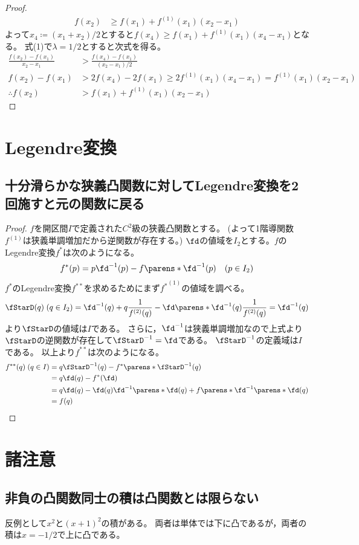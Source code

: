 \begin{proof}
\begin{align*}
                    f(x_2) &\geq f(x_1) + f^{(1)}(x_1)(x_2-x_1)
                \end{align*}
                よって$x_4 \coloneq (x_1 + x_2)/2$とすると$f(x_4) \geq f(x_1) + f^{(1)}(x_1)(x_4-x_1)$となる。
                式(1)で$\lambda=1/2$とすると次式を得る。
                \begin{align*}
                    \frac{f(x_2)-f(x_1)}{x_2-x_1} &> \frac{f(x_4) - f(x_1)}{(x_2-x_1)/2} \\
                    f(x_2)-f(x_1) &> 2f(x_4) - 2f(x_1) \geq 2f^{(1)}(x_1)(x_4-x_1) = f^{(1)}(x_1)(x_2-x_1) \\
                    \therefore f(x_2) &> f(x_1) + f^{(1)}(x_1)(x_2-x_1)
                \end{align*}
            \end{proof}
    \section{Legendre変換}
        \subsection{十分滑らかな狭義凸関数に対してLegendre変換を2回施すと元の関数に戻る}
            \begin{proof}
                $f$を開区間$I$で定義された$C^2$級の狭義凸関数とする。
                (よって1階導関数$f^{(1)}$は狭義単調増加だから逆関数が存在する。)
                $\fd$の値域を$I_2$とする。$f$のLegendre変換$f^*$は次のようになる。
                \[ f^*(p) = p\fd^{-1}(p) - f\parens*{\fd^{-1}(p)} \quad (p \in I_2) \]
                $f^*$のLegendre変換$f^{**}$を求めるためにまず${f^*}^{(1)}$の値域を調べる。
                \[ \fStarD(q)\;(q \in I_2) = \fd^{-1}(q) + q\frac{1}{f^{(2)}(q)} - \fd\parens*{\fd^{-1}(q)}\frac{1}{f^{(2)}(q)} = \fd^{-1}(q) \]
                より$\fStarD$の値域は$I$である。
                さらに，$\fd^{-1}$は狭義単調増加なので上式より$\fStarD$の逆関数が存在して$\fStarD^{-1} = \fd$である。
                $\fStarD^{-1}$の定義域は$I$である。
                以上より$f^{**}$は次のようになる。
                \begin{align*}
                    f^{**}(q)\; (q \in I) &= q\fStarD^{-1}(q) - f^*\parens*{\fStarD^{-1}(q)} \\
                    &= q\fd(q) - f^*(\fd) \\
                    &= q\fd(q) - \fd(q)\fd^{-1}\parens*{\fd(q)} + f\parens*{\fd^{-1}\parens*{\fd(q)}} \\
                    &= f(q)
                \end{align*}
            \end{proof}
            \let\fd\undefined
            \let\fStarD\undefined
    \section{諸注意}
        \subsection{非負の凸関数同士の積は凸関数とは限らない}
            反例として$x^2$と$(x+1)^2$の積がある。
            両者は単体では下に凸であるが，両者の積は$x=-1/2$で上に凸である。
